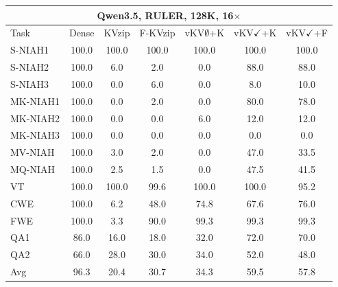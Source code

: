 \begin{tabular}{lcccccc}
\toprule
\multicolumn{7}{c}{Qwen3.5, RULER, 128K, 16$\times$} \\
\midrule
Task & Dense & KVzip & F-KVzip & vKV$\emptyset$+K & vKV$\checkmark$+K & vKV$\checkmark$+F \\
\midrule
S-NIAH1 & 100.0 & 100.0 & 100.0 & 100.0 & 100.0 & 100.0 \\
S-NIAH2 & 100.0 & 6.0 & 2.0 & 0.0 & 88.0 & 88.0 \\
S-NIAH3 & 100.0 & 0.0 & 6.0 & 0.0 & 8.0 & 10.0 \\
MK-NIAH1 & 100.0 & 0.0 & 2.0 & 0.0 & 80.0 & 78.0 \\
MK-NIAH2 & 100.0 & 0.0 & 0.0 & 6.0 & 12.0 & 12.0 \\
MK-NIAH3 & 100.0 & 0.0 & 0.0 & 0.0 & 0.0 & 0.0 \\
MV-NIAH & 100.0 & 3.0 & 2.0 & 0.0 & 47.0 & 33.5 \\
MQ-NIAH & 100.0 & 2.5 & 1.5 & 0.0 & 47.5 & 41.5 \\
VT & 100.0 & 100.0 & 99.6 & 100.0 & 100.0 & 95.2 \\
CWE & 100.0 & 6.2 & 48.0 & 74.8 & 67.6 & 76.0 \\
FWE & 100.0 & 3.3 & 90.0 & 99.3 & 99.3 & 99.3 \\
QA1 & 86.0 & 16.0 & 18.0 & 32.0 & 72.0 & 70.0 \\
QA2 & 66.0 & 28.0 & 30.0 & 34.0 & 52.0 & 48.0 \\
\midrule
Avg & 96.3 & 20.4 & 30.7 & 34.3 & 59.5 & 57.8 \\
\bottomrule
\end{tabular}
\vspace{0.8em}

